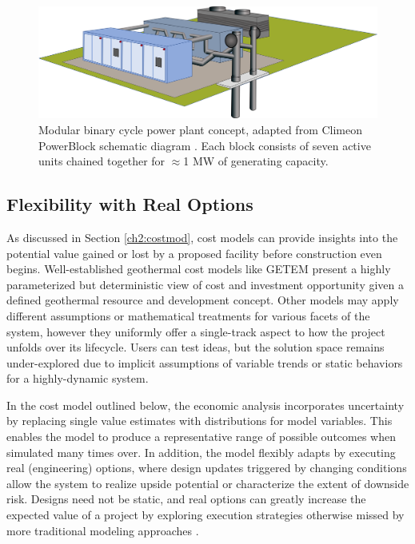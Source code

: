 \begin{figure}[!htp]
\centering
\includegraphics[width=\textwidth]{templates/images/Figure-Climeon-PowerBlock.png}
\caption[Modular power plant schematic]{Modular binary cycle power plant concept, adapted from Climeon PowerBlock schematic diagram \protect\citep{climeon_climeon_2021-1}. Each block consists of seven active units chained together for $\approx$1 MW of generating capacity.}
\label{fig:climeon_powerblock}
\end{figure}

\subsection{Flexibility with Real Options}
As discussed in Section \ref{ch2:costmod}, cost models can provide insights into the potential value gained or lost by a proposed facility before construction even begins. Well-established geothermal cost models like GETEM \citep{entingh_volume_2006} present a highly parameterized but deterministic view of cost and investment opportunity given a defined geothermal resource and development concept. Other models may apply different assumptions or mathematical treatments for various facets of the system, however they uniformly offer a single-track aspect to how the project unfolds over its lifecycle. Users can test ideas, but the solution space remains under-explored due to implicit assumptions of variable trends or static behaviors for a highly-dynamic system.  

In the cost model outlined below, the economic analysis incorporates uncertainty by replacing single value estimates with distributions for model variables. This enables the model to produce a representative range of possible outcomes when simulated many times over. In addition, the model flexibly adapts by executing real (engineering) options, where design updates triggered by changing conditions allow the system to realize upside potential or characterize the extent of downside risk. Designs need not be static, and real options can greatly increase the expected value of a project by exploring execution strategies otherwise missed by more traditional modeling approaches \citep[chap.6]{de_neufville_flexibility_2011}.

